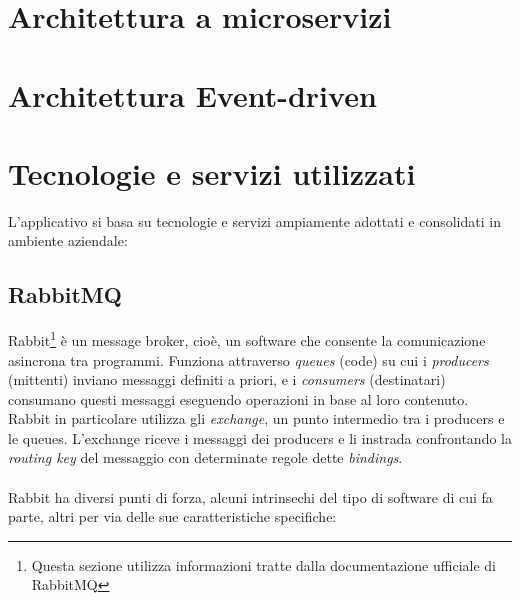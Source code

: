 \section{Architettura a microservizi}
\section{Architettura Event-driven}

\section{Tecnologie e servizi utilizzati}

L'applicativo si basa su tecnologie e servizi ampiamente adottati e consolidati in ambiente aziendale:

\subsection{RabbitMQ}
Rabbit\footnote{Questa sezione utilizza informazioni tratte dalla documentazione ufficiale di RabbitMQ\cite{rabbitmq}}
\`e un message broker, cio\`e, un software che consente la comunicazione asincrona tra programmi.
Funziona attraverso \textit{queues} (code) su cui i \textit{producers} (mittenti) inviano messaggi definiti a priori,
e i \textit{consumers} (destinatari) consumano questi messaggi eseguendo operazioni in base al loro contenuto.
Rabbit in particolare utilizza gli \textit{exchange}, un punto intermedio tra i producers e le queues.
L'exchange riceve i messaggi dei producers e li instrada confrontando la \textit{routing key} del messaggio con determinate regole dette \textit{bindings}.
\\\\
Rabbit ha diversi punti di forza, alcuni intrinsechi del tipo di software di cui fa parte, altri per via delle sue caratteristiche specifiche:\
